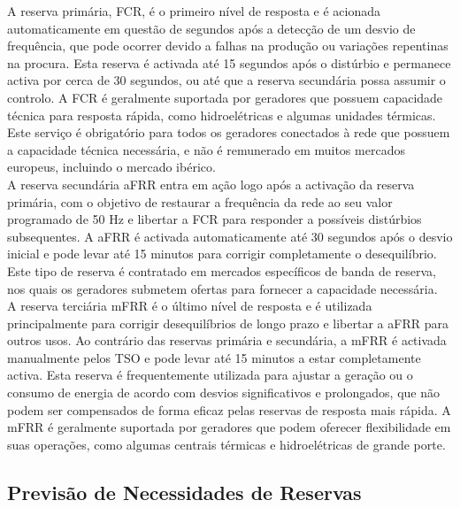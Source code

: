 A reserva primária, \gls{FCR}, é o primeiro nível de resposta e é acionada automaticamente em questão de segundos após a detecção de um desvio de frequência, que pode ocorrer devido a falhas na produção ou variações repentinas na procura. Esta reserva é activada até 15 segundos após o distúrbio e permanece activa por cerca de 30 segundos, ou até que a reserva secundária possa assumir o controlo. A \gls{FCR} é geralmente suportada por geradores que possuem capacidade técnica para resposta rápida, como hidroelétricas e algumas unidades térmicas. Este serviço é obrigatório para todos os geradores conectados à rede que possuem a capacidade técnica necessária, e não é remunerado em muitos mercados europeus, incluindo o mercado ibérico.\\
A reserva secundária \gls{aFRR} entra em ação logo após a activação da reserva primária, com o objetivo de restaurar a frequência da rede ao seu valor programado de 50 Hz e libertar a \gls{FCR} para responder a possíveis distúrbios subsequentes. A \gls{aFRR} é activada automaticamente até 30 segundos após o desvio inicial e pode levar até 15 minutos para corrigir completamente o desequilíbrio. Este tipo de reserva é contratado em mercados específicos de banda de reserva, nos quais os geradores submetem ofertas para fornecer a capacidade necessária.\\
A reserva terciária \gls{mFRR} é o último nível de resposta e é utilizada principalmente para corrigir desequilíbrios de longo prazo e libertar a \gls{aFRR} para outros usos. Ao contrário das reservas primária e secundária, a \gls{mFRR} é activada manualmente pelos \gls{TSO} e pode levar até 15 minutos a estar completamente activa. Esta reserva é frequentemente utilizada para ajustar a geração ou o consumo de energia de acordo com desvios significativos e prolongados, que não podem ser compensados de forma eficaz pelas reservas de resposta mais rápida. A \gls{mFRR} é geralmente suportada por geradores que podem oferecer flexibilidade em suas operações, como algumas centrais térmicas e hidroelétricas de grande porte.\\

\subsection{Previsão de Necessidades de Reservas \label{se:pred_impact_vres}}

